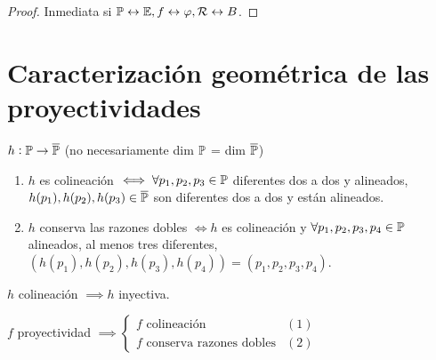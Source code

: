 \begin{proof}
    Inmediata si $\mathbb{P} \leftrightarrow \mathbb{E}, f \leftrightarrow \varphi, \mathcal{R} \leftrightarrow B$.
\end{proof}

\section{Caracterización geométrica de las proyectividades}

\begin{defi}
    $h : \mathbb{P} \to \overline{\mathbb{P}}$ (no necesariamente dim $\mathbb{P}$ = dim $\overline{\mathbb{P}}$)
    \begin{enumerate}
        \item $h$ es colineación $\iff \forall p_1, p_2, p_3 \in \mathbb{P}$ diferentes dos a dos y alineados, $h(p_1), h(p_2), h(p_3) \in \overline{\mathbb{P}}$ son diferentes dos a dos y están alineados.
        \item $h$ conserva las razones dobles $\iff h$ es colineación y $\forall p_1, p_2, p_3, p_4 \in \mathbb{P}$ alineados, al menos tres diferentes, $(h(p_1), h(p_2), h(p_3), h(p_4)) = (p_1, p_2, p_3, p_4)$.
    \end{enumerate}
\end{defi}
\begin{obs}
    $h$ colineación $\implies h$ inyectiva.
\end{obs}
\begin{prop}
    $f$ proyectividad $\implies \begin{cases} f \text{ colineación} & (1) \label{coli} \\ f \text{ conserva razones dobles} & (2) \label{cons_raz_dob} \end{cases}$
\end{prop}
